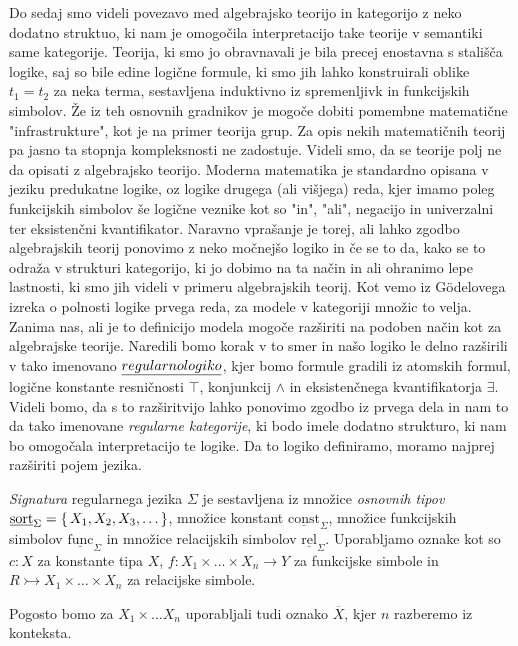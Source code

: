 Do sedaj smo videli povezavo med algebrajsko teorijo in kategorijo z neko dodatno struktuo, ki nam je omogočila interpretacijo take teorije v semantiki same kategorije. Teorija, ki smo jo obravnavali je bila precej enostavna s stališča logike, saj so bile edine logične formule, ki smo jih lahko konstruirali oblike $t_1 = t_2$ za neka terma, sestavljena induktivno iz spremenljivk in funkcijskih simbolov. 
Že iz teh osnovnih gradnikov je mogoče dobiti pomembne matematične "infrastrukture", kot je na primer teorija grup. Za opis nekih matematičnih teorij pa jasno ta stopnja kompleksnosti ne zadostuje.
Videli smo, da se teorije polj ne da opisati z algebrajsko teorijo. Moderna matematika je standardno opisana v jeziku predukatne logike, oz logike drugega (ali višjega) reda, kjer imamo poleg funkcijskih simbolov še logične veznike kot so "in", "ali", negacijo in univerzalni ter eksistenčni kvantifikator.
Naravno vprašanje je torej, ali lahko zgodbo algebrajskih teorij ponovimo z neko močnejšo logiko in če se to da, kako se to odraža v strukturi kategorijo, ki jo dobimo na ta način in ali ohranimo lepe lastnosti, ki smo jih videli v primeru algebrajskih teorij.
Kot vemo iz Gödelovega izreka o polnosti logike prvega reda, za modele v kategoriji množic to velja. Zanima nas, ali je to definicijo modela mogoče razširiti na podoben način kot za algebrajske teorije.
Naredili bomo korak v to smer in našo logiko le delno razširili v tako imenovano $\emph{regularno logiko}$, kjer bomo formule gradili iz atomskih formul, logične konstante resničnosti $\top$, konjunkcij $\wedge$ in eksistenčnega kvantifikatorja $\exists$.
Videli bomo, da s to razširitvijo lahko ponovimo zgodbo iz prvega dela in nam to da tako imenovane \emph{regularne kategorije}, ki bodo imele dodatno strukturo, ki nam bo omogočala interpretacijo te logike.
Da to logiko definiramo, moramo najprej razširiti pojem jezika.
%
\begin{definicija}
  \emph{Signatura} regularnega jezika $\Sigma$ je sestavljena iz množice \emph{osnovnih tipov} $\underline{\mathrm{sort}}_\Sigma = \{\,X_1, X_2, X_3, \ldots\,\}$, množice konstant $\underline{\mathrm{const}}_\Sigma$, množice funkcijskih simbolov $\underline{\mathrm{func}}_\Sigma$ in množice relacijskih simbolov $\underline{\mathrm{rel}}_\Sigma$. Uporabljamo oznake kot so $c : X$ za konstante tipa $X$, $f : X_1 \times \ldots \times X_n \to Y$ za funkcijske simbole in $R \rightarrowtail X_1 \times \ldots \times X_n$ za relacijske simbole.
\end{definicija}
Pogosto bomo za $X_1 \times \ldots X_n$ uporabljali tudi oznako $\overline{X}$, kjer $n$ razberemo iz konteksta.
